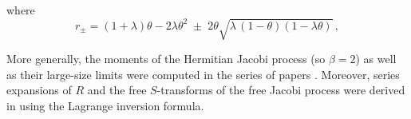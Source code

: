 \documentclass[12pt,reqno]{amsart}
\begin{document}
\noindent where
\begin{equation*}
r_{\pm}
= (1+\lambda)\theta - 2\lambda\theta^{2}
\;\pm\; 2\theta\sqrt{\lambda\,(1-\theta)(1-\lambda\theta)}\,,
\end{equation*}

More generally, the moments of the Hermitian Jacobi process (so $\beta=2$) as well as their large-size limits were computed in the series of papers \cite{MR3842169, MR4173022,MR4954166}. Moreover, series expansions of $R$ and the free $S$-transforms of the free Jacobi process were derived in \cite{MR3679612} using the Lagrange inversion formula.


\end{document}
